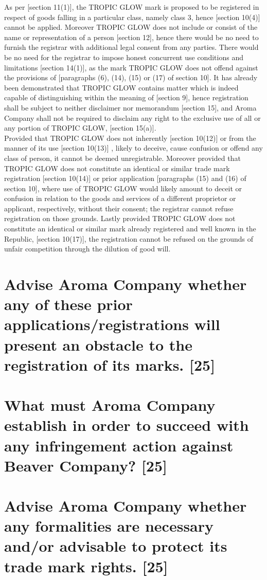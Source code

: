 \documentclass[11pt]{article}
\begin{document}
As per [section 11(1)]\cite{rsa93_tm_act}, the TROPIC GLOW mark is proposed to be
registered in respect of goods falling in a particular class, namely class 3,
hence [section 10(4)]\cite{rsa93_tm_act} cannot be applied.
Moreover TROPIC GLOW does not include or consist of the name or representation
of a person [section 12]\cite{rsa93_tm_act}, hence there would be no need to furnish the
registrar with additional legal consent from any parties. There would be no need
for the registrar to impose honest concurrent use conditions and limitations
[section 14(1)]\cite{rsa93_tm_act}, as the mark TROPIC GLOW does not offend
against the provisions of [paragraphs (6), (14), (15) or (17) of section
10]\cite{rsa93_tm_act}. It has already been demonstrated that TROPIC GLOW contains
matter which is indeed capable of distinguishing within the meaning of [section
9]\cite{rsa93_tm_act}, hence registration shall be subject to neither disclaimer
nor memorandum [section 15]\cite{rsa93_tm_act}, and Aroma Company shall not be
required to disclaim any right to the exclusive use of all or any portion of
TROPIC GLOW, [section 15(a)]\cite{rsa93_tm_act}.\\

Provided that TROPIC GLOW does not inherently [section 10(12)]\cite{rsa93_tm_act}
or from the manner of its use [section 10(13)]\cite{rsa93_tm_act} , likely to
deceive, cause confusion or offend any class of person, it cannot be deemed
unregistrable. Moreover provided that TROPIC GLOW does not constitute an
identical or similar trade mark registration [section 10(14)]\cite{rsa93_tm_act}
or prior application [paragraphs (15) and (16) of section 10]\cite{rsa93_tm_act},
where use of TROPIC GLOW would likely amount to deceit or confusion in relation
to the goods and services of a different proprietor or applicant, respectively,
without their consent; the registrar cannot refuse registration on those
grounds. Lastly provided TROPIC GLOW does not constitute an identical or similar
mark already registered and well known in the Republic, [section
10(17)]\cite{rsa93_tm_act}, the registration cannot be refused on the grounds of
unfair competition through the dilution of good will.

\section{Advise Aroma Company whether any of these prior applications/registrations will present an obstacle to the registration of its marks. [25]}
\label{sec:org0bb8ecc}

\section{What must Aroma Company establish in order to succeed with any infringement action against Beaver Company? [25]}
\label{sec:orgded410e}

\section{Advise Aroma Company whether any formalities are necessary and/or advisable to protect its trade mark rights. [25]}
\label{sec:org59c91d8}

\printbibliography
\end{document}
